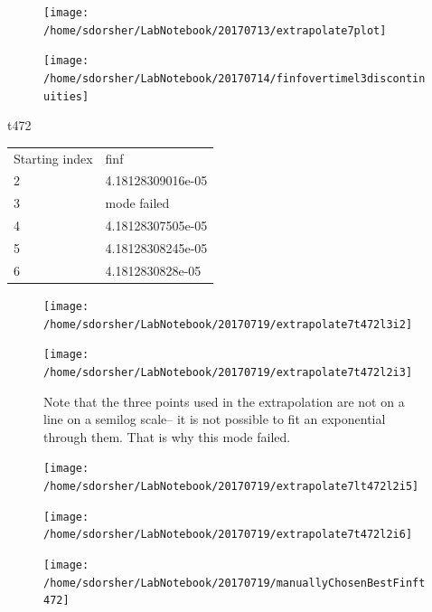 \begin{figure}
\texttt{[image: /home/sdorsher/LabNotebook/20170713/extrapolate7plot]}
\end{figure}

\begin{figure}
  \texttt{[image: /home/sdorsher/LabNotebook/20170714/finfovertimel3discontinuities]}
\end{figure}




t472
\begin{table}
\begin{tabular}{ll}
Starting index & finf\\
2 & 4.18128309016e-05\\
3 & mode failed\\
4 & 4.18128307505e-05\\
5 & 4.18128308245e-05\\
6 & 4.1812830828e-05\\
\end{tabular}
\end{table}


\begin{figure}
  \texttt{[image: /home/sdorsher/LabNotebook/20170719/extrapolate7t472l3i2]}
\end{figure}

\begin{figure}
  \texttt{[image: /home/sdorsher/LabNotebook/20170719/extrapolate7t472l2i3]}
  \caption{Note that the three points used in the extrapolation are not on a line on a semilog scale-- it is not possible to fit an exponential through them. That is why this mode failed.}
\end{figure}

\begin{figure}
  \texttt{[image: /home/sdorsher/LabNotebook/20170719/extrapolate7lt472l2i5]}
\end{figure}

\begin{figure}
  \texttt{[image: /home/sdorsher/LabNotebook/20170719/extrapolate7t472l2i6]}
\end{figure}

\begin{figure}
  \texttt{[image: /home/sdorsher/LabNotebook/20170719/manuallyChosenBestFinft472]}
\end{figure}


